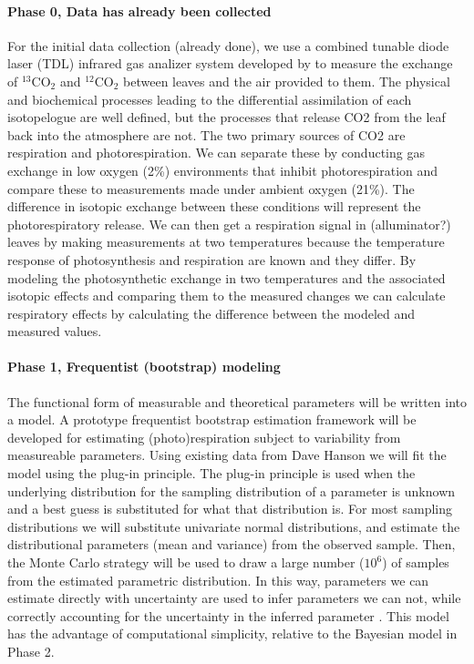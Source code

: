 \paragraph{Phase 0, Data has already been collected}
For the initial data collection (already done),
  we use a combined tunable diode laser (TDL) infrared gas analizer system
  developed by \citet{barbour2007new}
  to measure
  the exchange of $^{13}$CO$_2$ and $^{12}$CO$_2$ between leaves and the air provided to them.
The physical and biochemical processes leading to the differential assimilation of each isotopelogue
are well defined, but
the processes that release CO2 from the leaf back into the atmosphere are not.
The two primary sources of CO2 are respiration and photorespiration.
We can separate these by conducting gas exchange in low oxygen (2\%)
  environments that inhibit photorespiration and compare these to
  measurements made under ambient oxygen (21\%).
The difference in isotopic exchange between these conditions will represent
  the photorespiratory release.
We can then get a respiration signal in (alluminator?) leaves by making measurements
  at two temperatures because the temperature response of photosynthesis and respiration
  are known and they differ.
By modeling the photosynthetic exchange in two temperatures
  and the associated isotopic effects
  and comparing them to the measured changes we can calculate
  respiratory effects by calculating the difference between the modeled and measured values.

\paragraph{Phase 1, Frequentist (bootstrap) modeling}
The functional form of measurable and theoretical parameters
  will be written into a model.
A prototype frequentist bootstrap estimation framework will be developed
  for estimating (photo)respiration
  subject to variability from measureable parameters.
Using existing data from Dave Hanson we will fit the model using the plug-in principle.
The plug-in principle is used when the underlying distribution
  for the sampling distribution of a parameter is unknown
  and a best guess is substituted for what that distribution is.
For most sampling distributions we will substitute univariate normal distributions,
  and estimate the distributional parameters (mean and variance) from the observed sample.
Then, the Monte Carlo strategy will be used to draw a large number ($10^6$)
  of samples from the estimated parametric distribution.
In this way, parameters we can estimate directly with uncertainty
  are used to infer parameters we can not,
  while correctly accounting for the uncertainty in the inferred parameter
  \citep{DavisonHinkley:1997:Bootstrapmethodsand}.
This model has the advantage of computational simplicity,
  relative to the Bayesian model in Phase 2.

